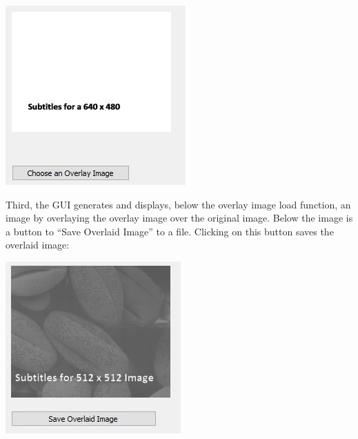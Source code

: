 \documentclass{article}
\newenvironment{Figure}
  {\par\medskip\noindent\ignorespaces\minipage{\linewidth}}
  {\endminipage\par\medskip}
\begin{document}
\begin{multicols*}{2}
\begin{Figure}
 \centering
 \includegraphics[width=\linewidth]{OverlayImage2.jpg}
\end{Figure}

Third, the GUI generates and displays, below the overlay image load function, an image by overlaying the overlay image over the original image. Below the image is a button to “Save Overlaid Image” to a file. Clicking on this button saves the overlaid image:


\begin{Figure}
 \centering
 \includegraphics[width=\linewidth]{OverlaidImage.jpg}
\end{Figure}


\end{multicols*}
\end{document}
